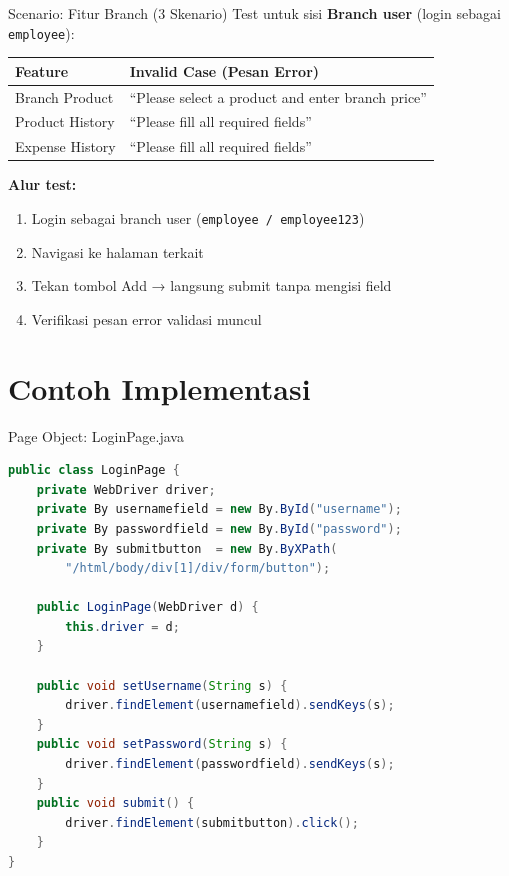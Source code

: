 \documentclass[aspectratio=169]{beamer}
\begin{document}
\begin{frame}{Scenario: Fitur Branch (3 Skenario)}
  Test untuk sisi \textbf{Branch user} (login sebagai \texttt{employee}):

  \begin{table}[h]
    \centering\small
    \begin{tabular}{ll}
      \toprule
      \textbf{Feature} & \textbf{Invalid Case (Pesan Error)} \\
      \midrule
      Branch Product   & ``Please select a product and enter branch price'' \\
      Product History  & ``Please fill all required fields'' \\
      Expense History  & ``Please fill all required fields'' \\
      \bottomrule
    \end{tabular}
  \end{table}

  \vspace{0.5em}
  \textbf{Alur test:}
  \begin{enumerate}
    \item Login sebagai branch user (\texttt{employee / employee123})
    \item Navigasi ke halaman terkait
    \item Tekan tombol Add → langsung submit tanpa mengisi field
    \item Verifikasi pesan error validasi muncul
  \end{enumerate}
\end{frame}

\section{Contoh Implementasi}

\begin{frame}[fragile]{Page Object: LoginPage.java}
\begin{lstlisting}[language=Java]
public class LoginPage {
    private WebDriver driver;
    private By usernamefield = new By.ById("username");
    private By passwordfield = new By.ById("password");
    private By submitbutton  = new By.ByXPath(
        "/html/body/div[1]/div/form/button");

    public LoginPage(WebDriver d) {
        this.driver = d;
    }

    public void setUsername(String s) {
        driver.findElement(usernamefield).sendKeys(s);
    }
    public void setPassword(String s) {
        driver.findElement(passwordfield).sendKeys(s);
    }
    public void submit() {
        driver.findElement(submitbutton).click();
    }
}
\end{lstlisting}
\end{frame}
\end{document}
